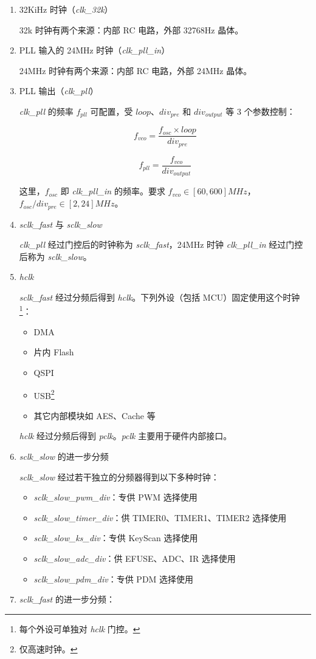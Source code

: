 \documentclass[
  12pt,
]{book}
\providecommand{\tightlist}{%
  \setlength{\itemsep}{0pt}\setlength{\parskip}{0pt}}
\begin{document}
\begin{enumerate}
\def\labelenumi{\arabic{enumi}.}
\item
  32KiHz 时钟（\emph{clk\_32k}）

  32k 时钟有两个来源：内部 RC 电路，外部 32768Hz 晶体。
\item
  PLL 输入的 24MHz 时钟（\emph{clk\_pll\_in}）

  24MHz 时钟有两个来源：内部 RC 电路，外部 24MHz 晶体。
\item
  PLL 输出（\emph{clk\_pll}）

  \emph{clk\_pll} 的频率 \(f_{pll}\) 可配置，受 \(loop\)、\(div_{pre}\) 和 \(div_{output}\) 等 3 个参数控制：

  \[f_{vco}=\frac{f_{osc}\times loop}{div_{pre}}\]

  \[f_{pll}=\frac{f_{vco}}{div_{output}}\]

  这里，\(f_{osc}\) 即 \emph{clk\_pll\_in} 的频率。要求 \(f_{vco} \in [60,600]MHz\)， \(f_{osc}/div_{pre} \in [2,24]MHz\)。
\item
  \emph{sclk\_fast} 与 \emph{sclk\_slow}

  \emph{clk\_pll} 经过门控后的时钟称为 \emph{sclk\_fast}，24MHz 时钟 \emph{clk\_pll\_in} 经过门控后称为 \emph{sclk\_slow}。
\item
  \emph{hclk}

  \emph{sclk\_fast} 经过分频后得到 \emph{hclk}。下列外设（包括 MCU）固定使用这个时钟\footnote{每个外设可单独对 \emph{hclk} 门控。}：

  \begin{itemize}
  \tightlist
  \item
    DMA
  \item
    片内 Flash
  \item
    QSPI
  \item
    USB\footnote{仅高速时钟。}
  \item
    其它内部模块如 AES、Cache 等
  \end{itemize}

  \emph{hclk} 经过分频后得到 \emph{pclk}。\emph{pclk} 主要用于硬件内部接口。
\item
  \emph{sclk\_slow} 的进一步分频

  \emph{sclk\_slow} 经过若干独立的分频器得到以下多种时钟：

  \begin{itemize}
  \tightlist
  \item
    \emph{sclk\_slow\_pwm\_div}：专供 PWM 选择使用
  \item
    \emph{sclk\_slow\_timer\_div}：供 TIMER0、TIMER1、TIMER2 选择使用
  \item
    \emph{sclk\_slow\_ks\_div}：专供 KeyScan 选择使用
  \item
    \emph{sclk\_slow\_adc\_div}：供 EFUSE、ADC、IR 选择使用
  \item
    \emph{sclk\_slow\_pdm\_div}：专供 PDM 选择使用
  \end{itemize}
\item
  \emph{sclk\_fast} 的进一步分频：


\end{enumerate}
\end{document}
